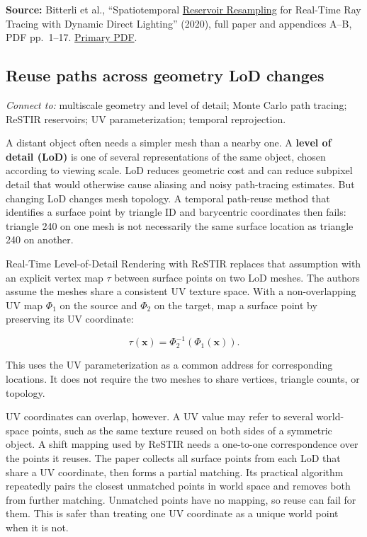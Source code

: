 \textbf{Source:} Bitterli et al., ``Spatiotemporal \hyperref[appendix-68be451b78b1]{Reservoir Resampling} for Real-Time Ray Tracing with Dynamic Direct Lighting'' (2020), full paper and appendices A--B, PDF pp.~1--17. \href{https://benedikt-bitterli.me/restir/bitterli20restir.pdf}{Primary PDF}.

\subsection{Reuse paths across geometry LoD changes}\label{03-visual-computing-i-ch012-reuse-paths-across-geometry-lod-changes}

\hypertarget{03-visual-computing-i-ch012-reuse-paths-across-geometry-lod-changes}{}

\emph{Connect to:} multiscale geometry and level of detail; Monte Carlo path tracing; ReSTIR reservoirs; UV parameterization; temporal reprojection.

A distant object often needs a simpler mesh than a nearby one. A \textbf{level of detail (LoD)} is one of several representations of the same object, chosen according to viewing scale. LoD reduces geometric cost and can reduce subpixel detail that would otherwise cause aliasing and noisy path-tracing estimates. But changing LoD changes mesh topology. A temporal path-reuse method that identifies a surface point by triangle ID and barycentric coordinates then fails: triangle 240 on one mesh is not necessarily the same surface location as triangle 240 on another.

Real-Time Level-of-Detail Rendering with ReSTIR replaces that assumption with an explicit vertex map \(\tau\) between surface points on two LoD meshes. The authors assume the meshes share a consistent UV texture space. With a non-overlapping UV map \(\Phi_1\) on the source and \(\Phi_2\) on the target, map a surface point by preserving its UV coordinate:

\[\tau(\mathbf{x})=\Phi_2^{-1}(\Phi_1(\mathbf{x})).\]

This uses the UV parameterization as a common address for corresponding locations. It does not require the two meshes to share vertices, triangle counts, or topology.

UV coordinates can overlap, however. A UV value may refer to several world-space points, such as the same texture reused on both sides of a symmetric object. A shift mapping used by ReSTIR needs a one-to-one correspondence over the points it reuses. The paper collects all surface points from each LoD that share a UV coordinate, then forms a partial matching. Its practical algorithm repeatedly pairs the closest unmatched points in world space and removes both from further matching. Unmatched points have no mapping, so reuse can fail for them. This is safer than treating one UV coordinate as a unique world point when it is not.

